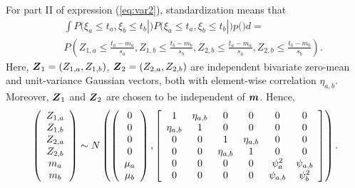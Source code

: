 \documentclass[aoas]{imsart}
\begin{document}
For part II of expression (\ref{eq:var2}), standardization means that
\begin{eqnarray}\label{part1:phi4}
&& \int P(\xi_a \leq t_a, \xi_b \leq t_b|\bm) P(\xi_a \leq t_a, \xi_b \leq t_b|\bm) p(\bm) d\bm =  \\
&& P\left( Z_{1,a} \leq \frac{t_a-m_{a}}{s_{a}}, 
Z_{1,b} \leq \frac{t_b-m_{b}}{s_{b}},Z_{2,b} \leq \frac{t_a-m_{a}}{s_{a}}, 
Z_{2,b} \leq \frac{t_b-m_{b}}{s_{b}} \right). \nonumber
\end{eqnarray}
Here,
${\boldsymbol Z}_1=(Z_{1,a},Z_{1,b})$, ${\boldsymbol Z}_2=(Z_{2,a},Z_{2,b})$ are independent bivariate zero-mean and unit-variance Gaussian vectors, both with element-wise correlation
$\eta_{a,b}$. Moreover, ${\boldsymbol Z}_1$ and ${\boldsymbol Z}_2$ are chosen to be independent of ${\boldsymbol m}$. Hence,
\begin{equation}
    \left(
    \begin{array}{cccccc}
         Z_{1,a} \\
         Z_{1,b} \\
         Z_{2,a} \\
         Z_{2,b} \\
         m_{a} \\
         m_{b}
    \end{array}
    \right)
\sim N \left(
\left(
    \begin{array}{cccccc}
    0 \\
    0 \\
    0 \\
    0 \\
          \mu_{a} \\
         \mu_{b} 
    \end{array}
    \right),
   \left[ 
      \begin{array}{cccccc}
        1 & \eta_{a,b} & 0 & 0 & 0 & 0  \\
        \eta_{a,b} & 1 & 0 & 0 & 0 & 0 \\
        0 & 0 & 1 & \eta_{a,b} & 0 & 0 \\
        0 & 0 & \eta_{a,b} & 1 & 0 & 0 \\
        0 & 0 & 0 & 0 & \psi^2_{a} & \psi_{a,b} \\
        0 & 0 & 0 & 0 & \psi_{a,b} & \psi^2_{b} 
    \end{array}
\right]
\right).
\vspace{0.2cm}
\end{equation}
\end{document}
